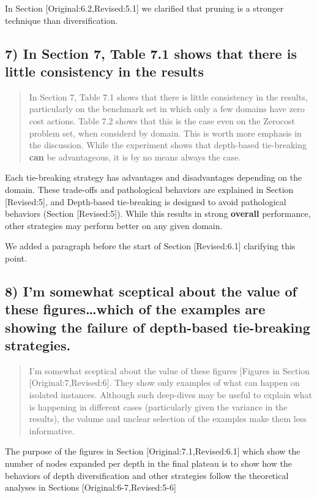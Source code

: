 \documentclass{article}
\begin{document}
In Section [Original:6.2,Revised:5.1] we clarified that pruning is a stronger technique
than diversification.

\subsection{7) In Section 7, Table 7.1 shows that there is little consistency in the results}
\label{sec:orgheadline32}

\begin{quote}
 In Section 7, Table 7.1 shows that there is little consistency in the
results, particularly on the benchmark set in which only a few domains
have zero cost actions. Table 7.2 shows that this is the case even on
the Zerocost problem set, when considerd by domain. This is worth more
emphasis in the discussion. While the experiment shows that
depth-based tie-breaking \textbf{can} be advantageous, it is by no means
always the case.
\end{quote}

Each tie-breaking strategy has advantages and disadvantages depending on the domain. 
These trade-offs and pathological behaviors are explained in Section [Revised:5], and 
Depth-based tie-breaking is designed to avoid pathological behaviors (Section [Revised:5]).
While this results in strong \textbf{overall} performance, other strategies
may perform better on any given  domain.

We added a paragraph before the start of Section [Revised:6.1]
clarifying this point.

\subsection{8) I'm somewhat sceptical about the value of these figures\ldots{}which of the examples are showing the failure of depth-based tie-breaking strategies.}
\label{sec:orgheadline33}

\begin{quote}
 I'm somewhat sceptical about the value of these figures [Figures in Section [Original:7,Revised:6]. They show
only examples of what can happen on isolated instances. Although such
deep-dives may be useful to explain what is happening in different
cases (particularly given the variance in the results), the volume and
unclear selection of the examples make them less informative. 
\end{quote}

The purpose of the figures in Section [Original:7.1,Revised:6.1] which
show the number of nodes expanded per depth in the final plateau is
to show how the behaviors of depth diversification and other
strategies follow the theoretical analyses in Sections
[Original:6-7,Revised:5-6]
\end{document}
